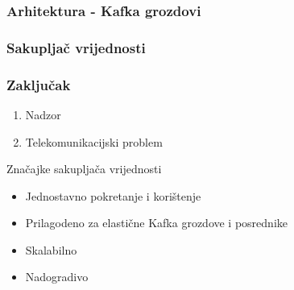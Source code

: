 \documentclass{beamer}
\begin{document}
\begin{frame}
\frametitle{Arhitektura - Kafka grozdovi}

\centering

\end{frame}

\begin{frame}
\frametitle{Sakupljač vrijednosti}

\hspace*{-4mm}

\end{frame}

\begin{frame}
\frametitle{Zaključak}

\begin{enumerate}
  \item Nadzor
  \item Telekomunikacijski problem
\end{enumerate}
\begin{block}{Značajke sakupljača vrijednosti}
\begin{itemize}
  \item Jednostavno pokretanje i korištenje
  \item Prilagodeno za elastične Kafka grozdove i posrednike
  \item Skalabilno
  \item Nadogradivo
\end{itemize}
\end{block}
\end{frame}
\end{document}

